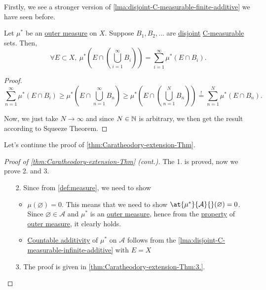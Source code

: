 Firstly, we see a stronger version of \autoref{lma:disjoint-C-measurable-finite-additive} we have seen before.
\begin{lemma}\label{lma:disjoint-C-measurable-infinite-additive}
	Let \(\mu^{*} \) be an \hyperref[def:outer-measure]{outer measure} on \(X\). Suppose \(B_1, B_2, \ldots\) are \underline{disjoint} \hyperref[def:C-measurable]{C-measurable} sets.
	Then,
	\[
		\forall E\subset X,\ \mu^{*} \left(E\cap \left(\bigcup\limits_{i=1}^{\infty} B_{i}\right)\right) = \sum\limits_{i=1}^{\infty} \mu^{*} \left(E\cap B_i\right).
	\]
\end{lemma}
\begin{proof}
	\[
		\sum\limits_{n=1}^{\infty} \mu^{*} (E\cap B_{i}) \geq \mu^{*} \left(E\cap \bigcup\limits_{n=1}^{\infty} B_{n}\right) \geq\mu^{*} \left(E\cap \left(\bigcup\limits_{n=1}^{N} B_{n}\right)\right) \overset{\hyperref[lma:disjoint-C-measurable-finite-additive]{!}}{=} \sum\limits_{n=1}^{N} \mu^{*} \left(E\cap B_n\right).
	\]

	Now, we just take \(N\to \infty \) and since \(N\in\mathbb{\MakeUppercase{N}} \) is arbitrary, we then get the result according to Squeeze Theorem.
\end{proof}

Let's continue the proof of \autoref{thm:Caratheodory-extension-Thm}.
\begin{proof}[Proof of \autoref{thm:Caratheodory-extension-Thm} (cont.)]\label{pf:Caratheodory-extension-Thm-cont}
	The 1. is proved, now we prove 2. and 3.
	\begin{enumerate}
		\item[2.] Since from \autoref{def:measure}, we need to show
			\begin{itemize}
				\item \(\mu (\varnothing ) = 0\). This means that we need to show \(\at{\mu^{*} }{\mathcal{A}}{}(\varnothing ) = 0\). Since \(\varnothing \in \mathcal{A} \) and \(\mu^{*}\) is
				      an \hyperref[def:outer-measure]{outer measure}, hence from the \hyperref[def:outer-measure-empty-measure]{property} of \hyperref[def:outer-measure]{outer measure}, it clearly holds.
				\item \hyperref[def:measure-countable-additivity]{Countable additivity} of \(\mu^{*} \) on \(\mathcal{A}\) follows from the \autoref{lma:disjoint-C-measurable-infinite-additive} with \(E = X\)
			\end{itemize}
		\item[3.] The proof is given in \autoref{thm:Caratheodory-extension-Thm:3.}.
	\end{enumerate}
\end{proof}


